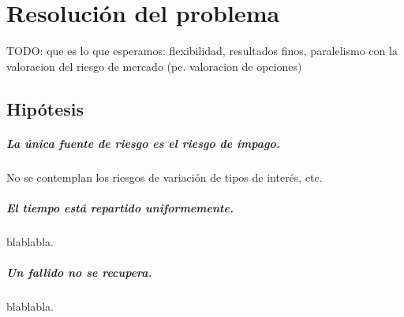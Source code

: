 
%
%
%
%
%
%
%
%

\chapter{Resoluci\'on del problema}
\label{sec:resolution}

TODO: que es lo que esperamos: flexibilidad, resultados finos, paralelismo 
con la valoracion del riesgo de mercado (pe. valoracion de opciones)


\section{Hip\'otesis}

\paragraph{La \'unica fuente de riesgo es el riesgo de impago.}
No se contemplan los riesgos de variaci\'on de tipos de inter\'es, etc.

\paragraph{El tiempo est\'a repartido uniformemente.}
blablabla.

\paragraph{Un fallido no se recupera.}
blablabla.

